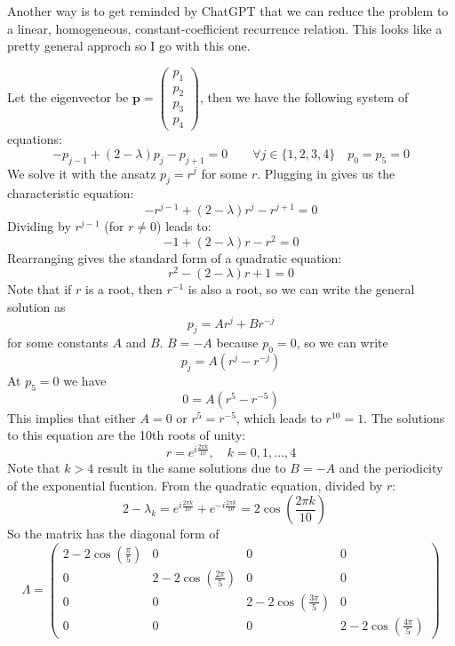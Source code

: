 \documentclass{article}
\begin{document}
Another way is to get reminded by ChatGPT that we can reduce the problem to a linear, homogeneous, constant-coefficient recurrence relation. This looks like a pretty general approch so I go with this one.

Let the eigenvector be $\mathbf{p} = \begin{pmatrix} p_1 \\ p_2 \\ p_3 \\ p_4 \end{pmatrix}$, then we have the following system of equations:
\[ - {p_{j - 1}} + \left( {2 - \lambda } \right){p_j} - {p_{j + 1}} = 0\qquad \forall j \in \{ 1,2,3,4\} \quad {p_0} = {p_5} = 0\]
We solve it with the ansatz $p_j = r^j$ for some $r$. Plugging in gives us the characteristic equation:
\[ - r^{j-1} + (2 - \lambda) r^j - r^{j+1} = 0 \]
Dividing by $r^{j-1}$ (for $r \neq 0$) leads to:
\[ - 1 + (2 - \lambda) r - r^2 = 0 \]
Rearranging gives the standard form of a quadratic equation:
\[ r^2 - (2 - \lambda) r + 1 = 0 \]
Note that if $r$ is a root, then $r^{-1}$ is also a root, so we can write the general solution as
\[ p_j = A r^j + B r^{-j} \]
for some constants $A$ and $B$. $B=-A$ because $p_0 = 0$, so we can write
\[ p_j = A \left( r^j - r^{-j} \right) \]
At $p_5  =0$ we have
\[ 0 = A \left( r^5 - r^{-5} \right) \]
This implies that either $A = 0$ or $r^5 = r^{-5}$, which leads to $r^{10} = 1$. The solutions to this equation are the 10th roots of unity:
\[ r = e^{i\frac{2\pi k}{10}}, \quad k = 0, 1, \ldots, 4 \]
Note that $k>4$ result in the same solutions due to $B=-A$ and the periodicity of the exponential fucntion. From the quadratic equation, divided by $r$:
\[2-\lambda_k = e^{i\frac{2\pi k}{10}} + e^{-i\frac{2\pi k}{10}} = 2 \cos\left(\frac{2\pi k}{10}\right)\quad \]
So the matrix has the diagonal form of
\[
    \Lambda = \begin{pmatrix}
        2 - 2\cos\left(\frac{\pi}{5}\right) & 0                                    & 0                                    & 0                                    \\
        0                                   & 2 - 2\cos\left(\frac{2\pi}{5}\right) & 0                                    & 0                                    \\
        0                                   & 0                                    & 2 - 2\cos\left(\frac{3\pi}{5}\right) & 0                                    \\
        0                                   & 0                                    & 0                                    & 2 - 2\cos\left(\frac{4\pi}{5}\right)
    \end{pmatrix}
\]
\end{document}
